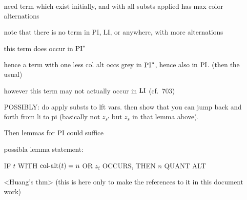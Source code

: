 \documentclass[%
	draft=false,%
	numbers=noendperiod,%
	11pt,%
	a4paper,%
	oneside,%
	openany,%
]{memoir}
\begin{document}
\begin{clemma}
	need term which exist initially, and with all substs applied has max color alternations

	note that there is no term in PI, LI, or anywhere, with more alternations

	this term does occur in $\operatorname{PI}^*$

	hence a term with one less col alt occs grey in $\operatorname{PI}^*$, hence also in $\operatorname{PI}$. (then the usual)

	however this term may not actually occur in $\operatorname{LI}$ (cf.\ 703)

	POSSIBLY: do apply substs to lft vars. then show that you can jump back and forth from li to pi (basically not $z_{s'}$ but $z_s$ in that lemma above).

	Then lemmas for $\operatorname{PI}$ could suffice

	possibla lemma statement:

	IF $t$ WITH $\operatorname{col-alt}(t) = n$ OR $z_t$ OCCURS, THEN $n$ QUANT ALT
\end{clemma}

\vfill
\begin{thm}
	<Huang's thm> (this is here only to make the references to it in this document work)
	\label{thm:two_phases}
\end{thm}
\end{document}
